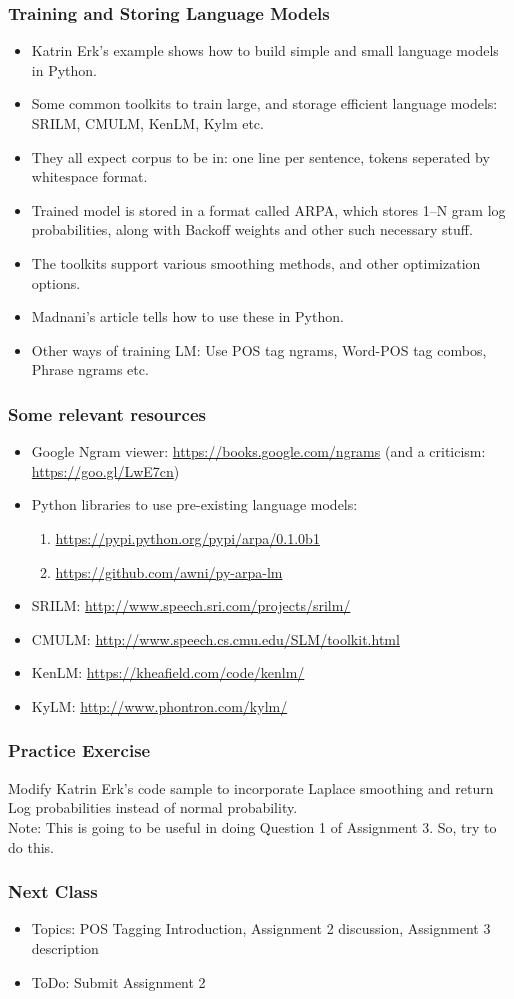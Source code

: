 \documentclass{beamer}
\begin{document}
\begin{frame}
\frametitle{Training and Storing Language Models}
\begin{itemize}
\item Katrin Erk's example shows how to build simple and small language models in Python.
\item Some common toolkits to train large, and storage efficient language models: SRILM, CMULM, KenLM, Kylm etc.
\item They all expect corpus to be in: one line per sentence, tokens seperated by whitespace format.
\item Trained model is stored in a format called ARPA, which stores 1--N gram log probabilities, along with Backoff weights and other such necessary stuff.
\item The toolkits support various smoothing methods, and other optimization options.
\item Madnani's article tells how to use these in Python.
\item Other ways of training LM: Use POS tag ngrams, Word-POS tag combos, Phrase ngrams etc.
\end{itemize}
\end{frame}

\begin{frame}
\frametitle{Some relevant resources}
\begin{itemize}
\item Google Ngram viewer: \url{https://books.google.com/ngrams} (and a criticism: \url{https://goo.gl/LwE7cn})
\item Python libraries to use pre-existing language models: 
\begin{enumerate}
\item \url{https://pypi.python.org/pypi/arpa/0.1.0b1}
\item \url{https://github.com/awni/py-arpa-lm} 
\end{enumerate}
\item SRILM: \url{http://www.speech.sri.com/projects/srilm/}
\item CMULM: \url{http://www.speech.cs.cmu.edu/SLM/toolkit.html}
\item KenLM: \url{https://kheafield.com/code/kenlm/}
\item KyLM: \url{http://www.phontron.com/kylm/}
\end{itemize}
\end{frame}

\begin{frame}
\frametitle{Practice Exercise}
Modify Katrin Erk's code sample to incorporate Laplace smoothing and return Log probabilities instead of normal probability.
\\Note: This is going to be useful in doing Question 1 of Assignment 3. So, try to do this.
\end{frame}

\begin{frame}
\frametitle{Next Class}
\begin{itemize}
\item Topics: POS Tagging Introduction, Assignment 2 discussion, Assignment 3 description
\item ToDo: Submit Assignment 2
\end{itemize}
\end{frame}
\end{document}
